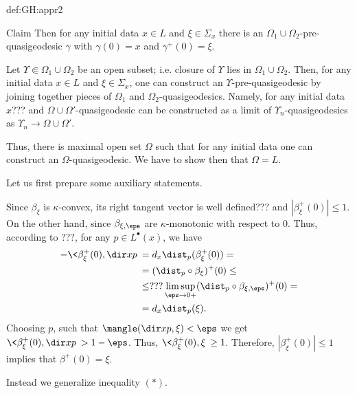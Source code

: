 {\begin{subthm}{def:GH:appr2}
\begin{thm}{Claim}
Then for any initial data $x\in L$ and $\xi\in\Sigma_x$ there is an $\Omega_1\cup\Omega_2$-pre-quasigeodesic $\gamma$ with
$\gamma(0)=x$ and $\gamma^+(0)=\xi$.
\end{thm}

Let $\Upsilon\Subset\Omega_1\cup \Omega_2$ be an open subset;
i.e. closure of $\Upsilon$ lies in $\Omega_1\cup \Omega_2$.
Then, for any initial data $x\in L$ and $\xi\in\Sigma_x$,
one can construct an $\Upsilon$-pre-quasigeodesic by joining together
pieces of $\Omega_1$ and $\Omega_2$-quasigeodesics.
Namely, for any initial data $x$???
 and $\Omega\cup \Omega'$-quasigeodesic can be constructed as a limit of $\Upsilon_n$-quasigeodesics as $\Upsilon_n\to \Omega\cup \Omega'$.

Thus, there is maximal open set $\Omega$ such that for any initial data
one can construct an $\Omega$-quasigeodesic. 
We have to show then that $\Omega=L$. 

Let us first prepare some auxiliary statements.





















Since $\beta_\xi$ is $\kappa$-convex, its right tangent vector is well defined??? and
$|\beta^+_\xi(0)|\le 1$.
On the other hand, since $\beta_{\xi,\eps}$ are $\kappa$-monotonic with respect to $0$.
Thus, according to ???, for any $p\in L^\bullet (x)$,
we have 
\begin{align*}
-\<\beta^+_\xi(0),\dir x{p}\>
&=
d_x\dist_p(\beta^+_{\xi}(0))
=
\\
&=
(\dist_p\circ\beta_{\xi})^+(0)
\le
\\
&\le???
\limsup_{\eps\to0+}(\dist_p\circ\beta_{\xi,\eps})^+(0)
=
\\
&=
d_x \dist_p(\xi).
\end{align*}
Choosing $p$, such that $\mangle(\dir xp,\xi)<\eps$ we get 
$\<\beta^+_\xi(0),\dir x{p}\>  >
 1-\eps$.
Thus, $\<\beta^+_\xi(0),\xi\>\ge 1$. 
Therefore, $|\beta^+_\xi(0)|\le 1$ implies that $\beta^+(0)=\xi$.







Instead we generalize inequality $(*)$.




\end{subthm}}
